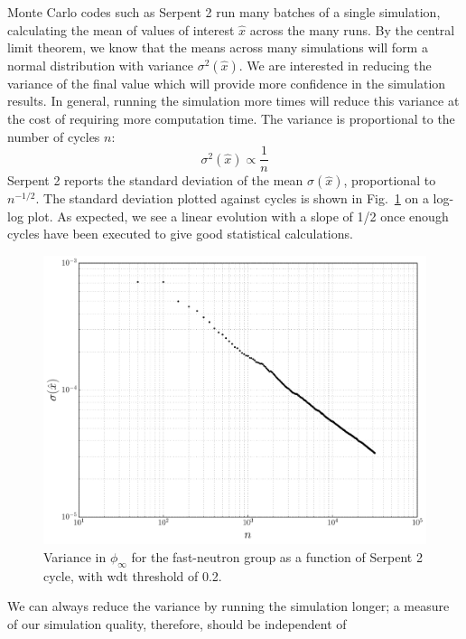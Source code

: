 Monte Carlo codes such as Serpent 2 run many batches of a single
simulation, calculating the mean of values of interest $\hat{x}$
across the many runs. By the central limit theorem, we know that the
means across many simulations will form a normal distribution with
variance $\sigma^2(\hat{x})$. We are interested in reducing the
variance of the final value which will provide more confidence in the
simulation results. In general, running the simulation more times will
reduce this variance at the cost of requiring more computation
time. The variance is proportional to the number of cycles $n$:
\begin{equation}
\label{eq:variance}
  \sigma^2(\hat{x}) \propto \frac{1}{n}
\end{equation}
Serpent 2 reports the standard deviation of the mean
$\sigma(\hat{x})$, proportional to $n^{-1/2}$. The standard deviation
plotted against cycles is shown in Fig.~\ref{fig:error_convergence} on
a log-log plot. As expected, we see a linear evolution with a slope of
1/2 once enough cycles have been executed to give good statistical calculations.
\begin{figure}[hbtp]
  \centering
  \includegraphics[scale=0.5]{images/error_convergence}
  \caption[Variance in $\phi_{\infty}$ for the fast-neutron group as a
    function of Serpent 2 cycle.]{Variance in $\phi_{\infty}$ for the fast-neutron group as a
    function of Serpent 2 cycle, with \gls{wdt} threshold of 0.2.}
  \label{fig:error_convergence}
\end{figure}
We can always reduce the variance by running the simulation longer; a
measure of our simulation quality, therefore, should be independent of
